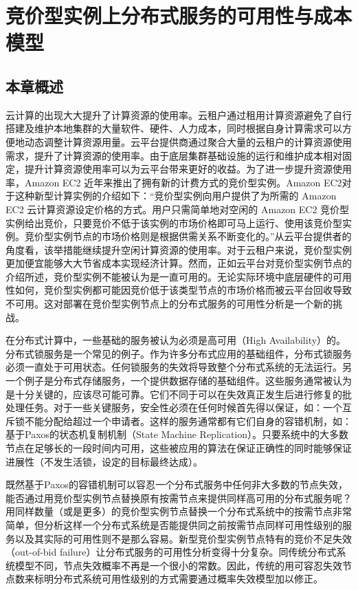 \chapter{竞价型实例上分布式服务的可用性与成本模型}
\label{cha:jupiter}

\section{本章概述}
\label{sec:jupiter_intro}
云计算的出现大大提升了计算资源的使用率。云租户通过租用计算资源避免了自行搭建及维护本地集群的大量软件、硬件、人力成本，同时根据自身计算需求可以方便地动态调整计算资源用量。云平台提供商通过聚合大量的云租户的计算资源使用需求，提升了计算资源的使用率。由于底层集群基础设施的运行和维护成本相对固定，提升计算资源使用率可以为云平台带来更好的收益。为了进一步提升资源使用率，Amazon EC2 近年来推出了拥有新的计费方式的竞价型实例。Amazon EC2对于这种新型计算实例的介绍如下：``竞价型实例向用户提供了为所需的 Amazon EC2 云计算资源设定价格的方式。用户只需简单地对空闲的 Amazon EC2 竞价型实例给出竞价，只要竞价不低于该实例的市场价格即可马上运行、使用该竞价型实例。竞价型实例节点的市场价格则是根据供需关系不断变化的。''从云平台提供者的角度看，该举措能继续提升空闲计算资源的使用率。对于云租户来说，竞价型实例更加便宜能够大大节省成本实现经济计算。然而，正如云平台对竞价型实例节点的介绍所述，竞价型实例不能被认为是一直可用的。无论实际环境中底层硬件的可用性如何，竞价型实例都可能因竞价低于该类型节点的市场价格而被云平台回收导致不可用。这对部署在竞价型实例节点上的分布式服务的可用性分析是一个新的挑战。

在分布式计算中，一些基础的服务被认为必须是高可用（High Availability）的。分布式锁服务是一个常见的例子。作为许多分布式应用的基础组件，分布式锁服务必须一直处于可用状态。任何锁服务的失效将导致整个分布式系统的无法运行。另一个例子是分布式存储服务，一个提供数据存储的基础组件。这些服务通常被认为是十分关键的，应该尽可能可靠。它们不同于可以在失效真正发生后进行修复的批处理任务\cite{5975137, Yi:2010:RCS:1844768.1845343}。对于一些关键服务，安全性必须在任何时候首先得以保证，如：一个互斥锁不能分配给超过一个申请者。这样的服务通常都有它们自身的容错机制，如：基于Paxos的状态机复制机制（State Machine Replication）。只要系统中的大多数节点在足够长的一段时间内可用，这些被应用的算法在保证正确性的同时能够保证进展性（不发生活锁，设定的目标最终达成）。

既然基于Paxos的容错机制可以容忍一个分布式服务中任何非大多数的节点失效，能否通过用竞价型实例节点替换原有按需节点来提供同样高可用的分布式服务呢？用同样数量（或是更多）的竞价型实例节点替换一个分布式系统中的按需节点非常简单，但分析这样一个分布式系统是否能提供同之前按需节点同样可用性级别的服务以及其实际的可用性则不是那么容易。新型竞价型实例节点特有的竞价不足失效（out-of-bid failure）让分布式服务的可用性分析变得十分复杂。同传统分布式系统模型不同，节点失效概率不再是一个很小的常数。因此，传统的用可容忍失效节点数来标明分布式系统可用性级别的方式需要通过概率失效模型加以修正。

